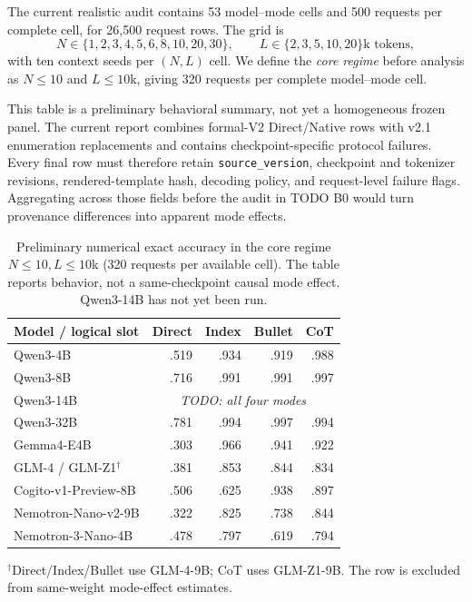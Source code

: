 The current realistic audit contains 53 model--mode cells and 500 requests per
complete cell, for 26,500 request rows. The grid is
\[
N\in\{1,2,3,4,5,6,8,10,20,30\},
\qquad
L\in\{2,3,5,10,20\}\text{k tokens},
\]
with ten context seeds per \((N,L)\) cell. We define the \emph{core regime} before analysis as \(N\leq10\) and \(L\leq10\)k, giving 320 requests per complete model--mode cell.

This table is a preliminary behavioral summary, not yet a homogeneous frozen
panel. The current report combines formal-V2 Direct/Native rows with v2.1
enumeration replacements and contains checkpoint-specific protocol failures.
Every final row must therefore retain \texttt{source\_version}, checkpoint and
tokenizer revisions, rendered-template hash, decoding policy, and request-level
failure flags. Aggregating across those fields before the audit in TODO B0
would turn provenance differences into apparent mode effects.

\begin{table}[H]
\centering
\small
\caption{Preliminary numerical exact accuracy in the core regime \(N\leq10,L\leq10\)k (320 requests per available cell). The table reports behavior, not a same-checkpoint causal mode effect. Qwen3-14B has not yet been run.}
\label{tab:core-behavior}
\begin{tabular}{@{}lrrrr@{}}
\toprule
Model / logical slot & Direct & Index & Bullet & CoT \\
\midrule
Qwen3-4B                  & .519 & .934 & .919 & .988 \\
Qwen3-8B                  & .716 & .991 & .991 & .997 \\
Qwen3-14B                 & \multicolumn{4}{c}{\textit{TODO: all four modes}} \\
Qwen3-32B                 & .781 & .994 & .997 & .994 \\
Gemma4-E4B                & .303 & .966 & .941 & .922 \\
GLM-4 / GLM-Z1\({}^\dagger\) & .381 & .853 & .844 & .834 \\
Cogito-v1-Preview-8B      & .506 & .625 & .938 & .897 \\
Nemotron-Nano-v2-9B       & .322 & .825 & .738 & .844 \\
Nemotron-3-Nano-4B        & .478 & .797 & .619 & .794 \\
\bottomrule
\end{tabular}
\vspace{0.25em}

\parbox{.94\textwidth}{\footnotesize \({}^\dagger\)Direct/Index/Bullet use GLM-4-9B; CoT uses GLM-Z1-9B. The row is excluded from same-weight mode-effect estimates.}
\end{table}

